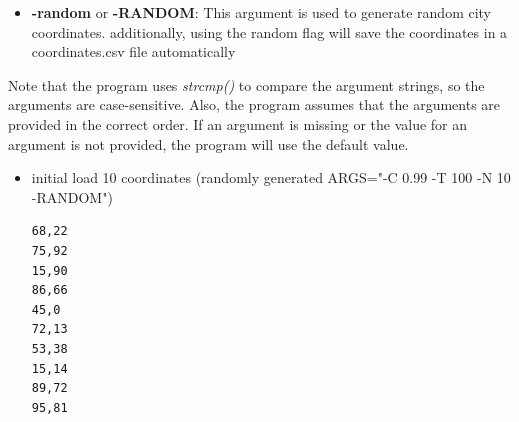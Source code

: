 \documentclass[a4paper,10pt]{article}
\begin{document}
 \begin{itemize}
     \item \textbf{-random} or \textbf{-RANDOM}: This argument is used to generate random city coordinates. 
     additionally, using the random flag will save the coordinates in a coordinates.csv file automatically
 \end{itemize}
 
Note that the program uses \textit{strcmp()} to compare the argument strings, so the arguments are case-sensitive. Also, the program assumes that the arguments are provided in the correct order. If an argument is missing or the value for an argument is not provided, the program will use the default value.

\begin{itemize}

\item initial load 10 coordinates (randomly 
generated ARGS="-C 0.99 -T 100 -N 10 -RANDOM")
\begin{lstlisting}[style = stdio]
68,22
75,92
15,90
86,66
45,0
72,13
53,38
15,14
89,72
95,81
\end{lstlisting}


\end{itemize}
\end{document}
